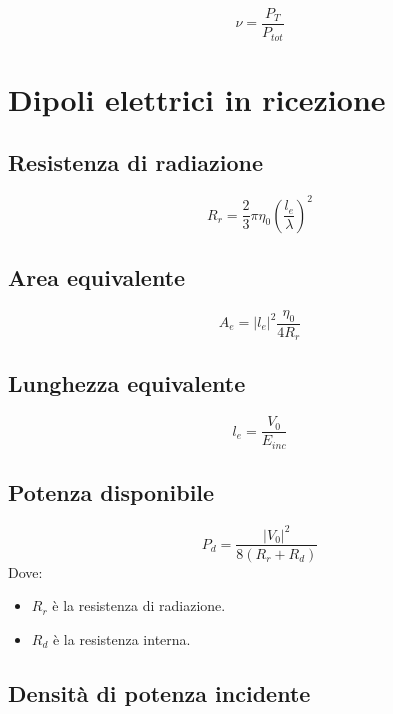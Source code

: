 \documentclass[10pt,a4paper]{report}
\begin{document}
	  	\begin{equation}
		\nu=\frac{P_{T}}{P_{tot}}
	  	\end{equation}


		\section{Dipoli elettrici in ricezione}

			\subsection{Resistenza di radiazione}			
				\begin{equation}
				R_r=\frac{2}{3}\pi\eta_0(\frac{l_e}{\lambda})^2
				\end{equation}

			\subsection{Area equivalente}			
				\begin{equation}
				A_e=|l_e|^2\frac{\eta_0}{4R_r}
				\end{equation}

			\subsection{Lunghezza equivalente}			
				\begin{equation}
				l_e=\frac{V_0}{E_{inc}}
				\label{eq:lunghezza-equivalente}
				\end{equation}

			\subsection{Potenza disponibile}			
				\begin{equation}
			P_d=\frac{|V_0|^2}{8(R_r+R_d)}
				\end{equation}
			Dove:

			\begin{itemize}
			\item $R_r$ è la resistenza di radiazione.
			\item $R_d$ è la resistenza interna.
			\end{itemize}
			
			\subsection{Densità di potenza incidente}
\end{document}
